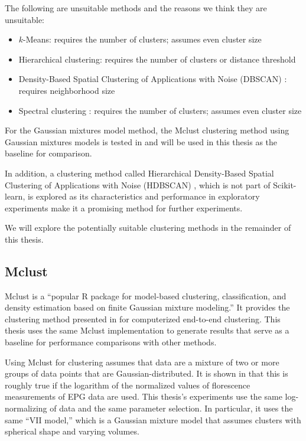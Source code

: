The following are unsuitable methods and the reasons we think they are unsuitable:

\begin{itemize}
  \item $k$-Means: requires the number of clusters; assumes even cluster size
  \item Hierarchical clustering: requires the number of clusters or distance threshold
  \item Density-Based Spatial Clustering of Applications with Noise (DBSCAN) \cite{ester_density-based_1996}\cite{schubert_dbscan_2017}: requires neighborhood size
  \item Spectral clustering \cite{jianbo_shi_normalized_2000}: requires the number of clusters; assumes even cluster size
\end{itemize}

For the Gaussian mixtures model method, the Mclust clustering method using Gaussian mixtures models is tested in \cite{odonnell_clustering_2021} and will be used in this thesis as the baseline for comparison.

In addition, a clustering method called Hierarchical Density-Based Spatial Clustering of Applications with Noise (HDBSCAN) \cite{hutchison_density-based_2013}\cite{mcinnes_accelerated_2017}\cite{mcinnes_hdbscan_2017}, which is not part of Scikit-learn, is explored as its characteristics and performance in exploratory experiments make it a promising method for further experiments.

We will explore the potentially suitable clustering methods in the remainder of this thesis.

\subsection{Mclust}

Mclust is a ``popular R package for model-based clustering, classification, and density estimation based on finite Gaussian mixture modeling.'' \cite{scrucca_mclust_2016} It provides the clustering method presented in \cite{odonnell_clustering_2021} for computerized end-to-end clustering. This thesis uses the same Mclust implementation to generate results that serve as a baseline for performance comparisons with other methods.

Using Mclust for clustering assumes that data are a mixture of two or more groups of data points that are Gaussian-distributed. It is shown in \cite{odonnell_clustering_2021} that this is roughly true if the logarithm of the normalized values of florescence measurements of EPG data are used. This thesis's experiments use the same log-normalizing of data and the same parameter selection. In particular, it uses the same ``VII model,'' which is a Gaussian mixture model that assumes clusters with spherical shape and varying volumes.

